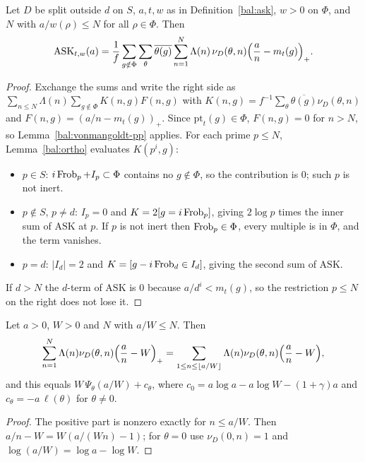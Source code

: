 \begin{lemma}\label{bal:ask-expansion}
Let $D$ be split outside $d$ on $S$, $a,t,w$ as in Definition~\ref{bal:ask}, $w>0$ on $\Phi$, and $N$ with $a/w(\rho)\le N$ for all $\rho\in\Phi$. Then
\[\mathrm{ASK}_{t,w}(a)=\frac1f\sum_{g\notin\Phi}\sum_{\theta}\overline{\theta(g)}\sum_{n=1}^N\Lambda(n)\,\nu_D(\theta,n)\Bigl(\frac an-m_t(g)\Bigr)_+ .\]
\end{lemma}
\begin{proof}
Exchange the sums and write the right side as $\sum_{n\le N}\Lambda(n)\sum_{g\notin\Phi}K(n,g)F(n,g)$ with $K(n,g)=f^{-1}\sum_{\theta}\overline{\theta(g)}\nu_D(\theta,n)$ and $F(n,g)=(a/n-m_t(g))_+$. Since $\mathrm{pt}_t(g)\in\Phi$, $F(n,g)=0$ for $n>N$, so Lemma~\ref{bal:vonmangoldt-pp} applies. For each prime $p\le N$, Lemma~\ref{bal:ortho} evaluates $K(p^i,g)$:
\begin{itemize}
\item $p\in S$: $i\operatorname{Frob}_p+I_p\subset\Phi$ contains no $g\notin\Phi$, so the contribution is $0$; such $p$ is not inert.
\item $p\notin S$, $p\ne d$: $I_p=0$ and $K=2[g=i\operatorname{Frob}_p]$, giving $2\log p$ times the inner sum of $\mathrm{ASK}$ at $p$. If $p$ is not inert then $\operatorname{Frob}_p\in\Phi$, every multiple is in $\Phi$, and the term vanishes.
\item $p=d$: $|I_d|=2$ and $K=[g-i\operatorname{Frob}_d\in I_d]$, giving the second sum of $\mathrm{ASK}$.
\end{itemize}
If $d>N$ the $d$-term of $\mathrm{ASK}$ is $0$ because $a/d^i<m_t(g)$, so the restriction $p\le N$ on the right does not lose it.
\end{proof}

\begin{lemma}[Cutting at $a/W$]\label{bal:cut}
Let $a>0$, $W>0$ and $N$ with $a/W\le N$. Then
\[\sum_{n=1}^N\Lambda(n)\nu_D(\theta,n)\Bigl(\frac an-W\Bigr)_+=\sum_{1\le n\le\lfloor a/W\rfloor}\Lambda(n)\nu_D(\theta,n)\Bigl(\frac an-W\Bigr),\]
and this equals $W\,\Psi_{\theta}(a/W)+c_{\theta}$, where $c_0=a\log a-a\log W-(1+\gamma)a$ and $c_{\theta}=-a\,\ell(\theta)$ for $\theta\ne0$.
\end{lemma}
\begin{proof}
The positive part is nonzero exactly for $n\le a/W$. Then $a/n-W=W(a/(Wn)-1)$; for $\theta=0$ use $\nu_D(0,n)=1$ and $\log(a/W)=\log a-\log W$.
\end{proof}

